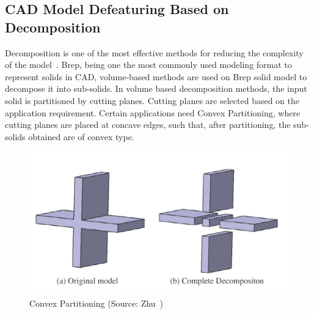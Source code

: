 	

\subsection{CAD Model Defeaturing Based on Decomposition}

Decomposition is one of the most effective methods for reducing the complexity of the model~\cite{Zhu2015}. Brep, being one the most commonly used modeling format to represent solids in CAD, volume-based methods are used on Brep solid model to decompose it into sub-solids. In volume based decomposition methods, the input solid is partitioned by cutting planes. Cutting planes are selected based on the application requirement. Certain applications need Convex Partitioning, where cutting planes are placed at concave edges, such that, after partitioning, the sub-solids obtained are of convex type. 


	\begin{figure} [!h]
		\centering
		\includegraphics[width=0.6\linewidth]{..//Common/images/zhudecomp}
		\caption{Convex Partitioning (Source: Zhu~\cite{Zhu2016})}
		\label{fig:introduction:zhudecomp}
	\end{figure} 

